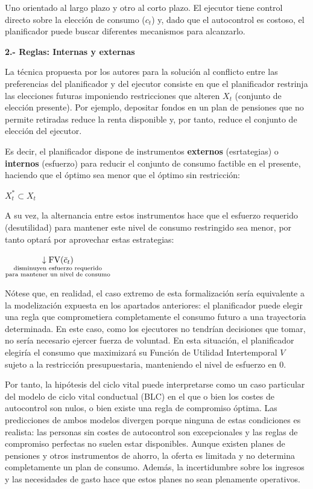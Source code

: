 \documentclass[10pt,a4paper]{article}
\begin{document}
Uno orientado al largo plazo y otro al corto plazo. El ejecutor tiene control directo sobre la elección de consumo ($c_t$) y, dado que el autocontrol es costoso, el planificador puede buscar diferentes mecanismos para alcanzarlo.

\textbf{2.- Reglas: Internas y externas}

La técnica propuesta por los autores para la solución al conflicto entre las preferencias del planificador y del ejecutor consiste en que el planificador restrinja las elecciones futuras imponiendo restricciones que alteren $X_t$ (conjunto de elección presente). Por ejemplo, depositar fondos en un plan de pensiones que no permite retiradas reduce la renta disponible y, por tanto, reduce el conjunto de elección del ejecutor.

Es decir, el planificador dispone de instrumentos \textbf{externos} (esrtategias) o \textbf{internos} (esfuerzo) para reducir el conjunto de consumo factible en el presente, haciendo que el óptimo sea menor que el óptimo sin restricción:

$X_t^*\subset X_t$

A su vez, la alternancia entre estos instrumentos hace que el esfuerzo requerido (desutilidad) para mantener este nivel de consumo restringido sea menor, por tanto optará por aprovechar estas estrategias:

$\underset{\substack{\text{\scriptsize disminuyen esfuerzo requerido}\\\text{\scriptsize para mantener un nivel de consumo}}}{\downarrow\text{FV}(\bar c_t)}$

Nótese que, en realidad, el caso extremo de esta formalización sería equivalente a la modelización expuesta en los apartados anteriores: el planificador puede elegir una regla que comprometiera completamente el consumo futuro a una trayectoria determinada. En este caso, como los ejecutores no tendrían decisiones que tomar, no sería necesario ejercer fuerza de voluntad. En esta situación, el planificador elegiría el consumo que maximizará su Función de Utilidad Intertemporal $V$ sujeto a la restricción presupuestaria, manteniendo el nivel de esfuerzo en $0$. 

Por tanto, la hipótesis del ciclo vital puede interpretarse como un caso particular del modelo de ciclo vital conductual (BLC) en el que o bien los costes de autocontrol son nulos, o bien existe una regla de compromiso óptima. Las predicciones de ambos modelos divergen porque ninguna de estas condiciones es realista: las personas sin costes de autocontrol son excepcionales y las reglas de compromiso perfectas no suelen estar disponibles. Aunque existen planes de pensiones y otros instrumentos de ahorro, la oferta es limitada y no determina completamente un plan de consumo. Además, la incertidumbre sobre los ingresos y las necesidades de gasto hace que estos planes no sean plenamente operativos.
\end{document}
